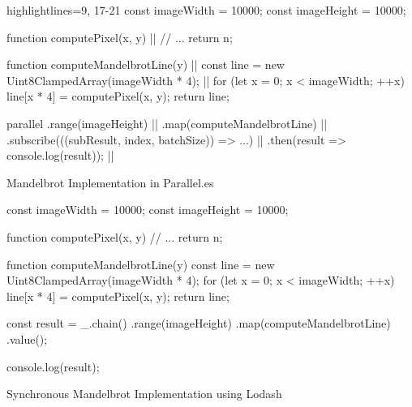 \begin{listing}
	\begin{javascriptcode*}{highlightlines={9, 17-21}}
const imageWidth = 10000;
const imageHeight = 10000;

function computePixel(x, y) { |$\label{code:mandelbrot-compute-pixel}$|
	// ...
	return n;
}

function computeMandelbrotLine(y) { |$\label{code:parallel-es-operation}$|
	const line = new Uint8ClampedArray(imageWidth * 4); |$\label{code:mandelbrot-reference1-imageWidth}$|
	for (let x = 0; x < imageWidth; ++x) {
		line[x * 4] = computePixel(x, y);
	}
	return line;
}

parallel
	.range(imageHeight) |$\label{code:parallel-es-definition-start}$|
	.map(computeMandelbrotLine)	 |$\label{code:parallel-es-map}$|
	.subscribe(((subResult, index, batchSize)) => ...) |$\label{code:parallel-es-subscribe}$|
	.then(result => console.log(result)); |$\label{code:parallel-es-start}$|
	\end{javascriptcode*}
	
	\caption{Mandelbrot Implementation in Parallel.es}
	\label{code:mandelbrot-parallel.es}
\end{listing}


\begin{listing}
	
	\begin{javascriptcode}
const imageWidth = 10000;
const imageHeight = 10000;

function computePixel(x, y) {
	// ...
	return n;
}

function computeMandelbrotLine(y) {
	const line = new Uint8ClampedArray(imageWidth * 4);
	for (let x = 0; x < imageWidth; ++x) {
		line[x * 4] = computePixel(x, y);
	}
	return line;
}

const result = _.chain()
	.range(imageHeight)
	.map(computeMandelbrotLine)
	.value();
	
console.log(result);
\end{javascriptcode}
\caption{Synchronous Mandelbrot Implementation using Lodash~\cite{lodash}}
\label{fig:mandelbrot-sync}
\end{listing}